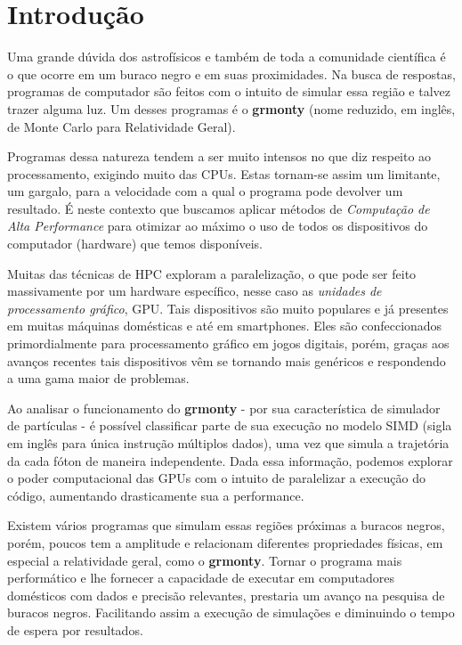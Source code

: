 \chapter{Introdução}
\label{cap:introducao}

Uma grande dúvida dos astrofísicos e também de toda a comunidade científica é o que ocorre em um buraco negro e em suas proximidades. Na busca de respostas, programas de computador são feitos com o intuito de simular essa região e talvez trazer alguma luz. Um desses programas é o \textbf{grmonty}\citep{Dolence:09} (nome reduzido, em inglês, de Monte Carlo para Relatividade Geral).

Programas dessa natureza tendem a ser muito intensos no que diz respeito ao processamento, exigindo muito das CPUs. Estas tornam-se assim um limitante, um gargalo, para a velocidade com a qual o programa pode devolver um resultado. É neste contexto que buscamos aplicar métodos de \emph{Computação de Alta Performance} para otimizar ao máximo o uso de todos os dispositivos do computador (hardware) que temos disponíveis.

Muitas das técnicas de HPC exploram a paralelização, o que pode ser feito massivamente por um hardware específico, nesse caso as \emph{unidades de processamento gráfico}, GPU. Tais dispositivos são muito populares e já presentes em muitas máquinas domésticas e até em smartphones. Eles são confeccionados primordialmente para processamento gráfico em jogos digitais, porém, graças aos avanços recentes tais dispositivos vêm se tornando mais genéricos e respondendo a uma gama maior de problemas.

Ao analisar o funcionamento do \textbf{grmonty} - por sua característica de simulador de partículas - é possível classificar parte de sua execução no modelo SIMD (sigla em inglês para única instrução múltiplos dados), uma vez que simula a trajetória da cada fóton de maneira independente. Dada essa informação, podemos explorar o poder computacional das GPUs com o intuito de paralelizar a execução do código, aumentando drasticamente sua a performance.

Existem vários programas que simulam essas regiões próximas a buracos negros, porém, poucos tem a amplitude e relacionam diferentes propriedades físicas, em especial a relatividade geral, como o \textbf{grmonty}. Tornar o programa mais performático e lhe fornecer a capacidade de executar em computadores domésticos com dados e precisão relevantes, prestaria um avanço na pesquisa de buracos negros. Facilitando assim a execução de simulações e diminuindo o tempo de espera por resultados.

